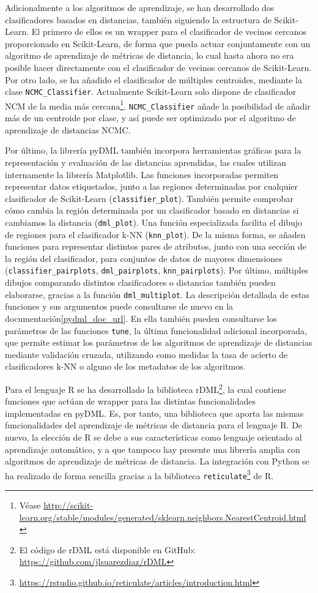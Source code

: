 Adicionalmente a los algoritmos de aprendizaje, se han desarrollado dos clasificadores basados en distancias, también siguiendo la estructura de Scikit-Learn. El primero de ellos es un wrapper para el clasificador de vecinos cercanos proporcionado en Scikit-Learn, de forma que pueda actuar conjuntamente con un algoritmo de aprendizaje de métricas de distancia, lo cual hasta ahora no era posible hacer directamente con el clasificador de vecinos cercanos de Scikit-Learn. Por otro lado, se ha añadido el clasificador de múltiples centroides, mediante la clase \texttt{NCMC\_Classifier}. Actualmente Scikit-Learn solo dispone de clasificador NCM de la media más cercana\footnote{Véase \url{http://scikit-learn.org/stable/modules/generated/sklearn.neighbors.NearestCentroid.html}}. \texttt{NCMC\_Classifier} añade la posibilidad de añadir más de un centroide por clase, y así puede ser optimizado por el algoritmo de aprendizaje de distancias NCMC.

Por último, la librería pyDML también incorpora herramientas gráficas para la representación y evaluación de las distancias aprendidas, las cuales utilizan internamente la librería Matplotlib. Las funciones incorporadas permiten representar datos etiquetados, junto a las regiones determinadas por cualquier clasificador de Scikit-Learn (\texttt{classifier\_plot}). También permite comprobar cómo cambia la región determinada por un clasificador basado en distancias si cambiamos la distancia (\texttt{dml\_plot}). Una función especializada facilita el dibujo de regiones para el clasificador k-NN (\texttt{knn\_plot}). De la misma forma, se añaden funciones para representar distintos pares de atributos, junto con una sección de la región del clasificador, para conjuntos de datos de mayores dimensiones (\texttt{classifier\_pairplots}, \texttt{dml\_pairplots}, \texttt{knn\_pairplots}). Por último, múltiples dibujos comparando distintos clasificadores o distancias también pueden elaborarse, gracias a la función \texttt{dml\_multiplot}. La descripción detallada de estas funciones y sus argumentos puede consultarse de nuevo en la documentación\cref{pydml_doc_url}. En ella también pueden consultarse los parámetros de las funciones \texttt{tune}, la última funcionalidad adicional incorporada, que permite estimar los parámetros de los algoritmos de aprendizaje de distancias mediante validación cruzada, utilizando como medidas la tasa de acierto de clasificadores k-NN o alguno de los metadatos de los algoritmos.

Para el lenguaje R se ha desarrollado la biblioteca rDML\footnote{El código de rDML está disponible en GitHub: \url{https://github.com/jlsuarezdiaz/rDML}}, la cual contiene funciones que actúan de wrapper para las distintas funcionalidades implementadas en pyDML. Es, por tanto, una biblioteca que aporta las mismas funcionalidades del aprendizaje de métricas de distancia para el lenguaje R. De nuevo, la elección de R se debe a sus características como lenguaje orientado al aprendizaje automático, y a que tampoco hay presente una librería amplia con algoritmos de aprendizaje de métricas de distancia. La integración con Python se ha realizado de forma sencilla gracias a la biblioteca \texttt{reticulate}\footnote{\url{https://rstudio.github.io/reticulate/articles/introduction.html}} de R.


